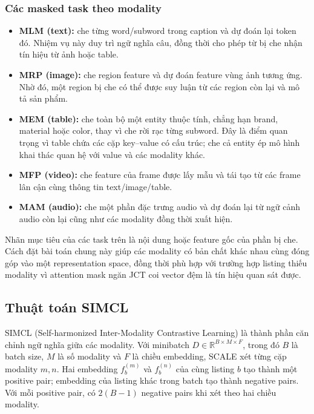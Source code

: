 \documentclass[10pt,conference]{IEEEtran}
\begin{document}
\subsubsection{Các masked task theo modality}

\begin{itemize}[leftmargin=*]
    \item \textbf{MLM (text):} che từng word/subword trong caption và dự đoán lại token đó. Nhiệm vụ này duy trì ngữ nghĩa câu, đồng thời cho phép từ bị che nhận tín hiệu từ ảnh hoặc table.
    \item \textbf{MRP (image):} che region feature và dự đoán feature vùng ảnh tương ứng. Nhờ đó, một region bị che có thể được suy luận từ các region còn lại và mô tả sản phẩm.
    \item \textbf{MEM (table):} che toàn bộ một entity thuộc tính, chẳng hạn brand, material hoặc color, thay vì che rời rạc từng subword. Đây là điểm quan trọng vì table chứa các cặp key--value có cấu trúc; che cả entity ép mô hình khai thác quan hệ với value và các modality khác.
    \item \textbf{MFP (video):} che feature của frame được lấy mẫu và tái tạo từ các frame lân cận cùng thông tin text/image/table.
    \item \textbf{MAM (audio):} che một phần đặc trưng audio và dự đoán lại từ ngữ cảnh audio còn lại cũng như các modality đồng thời xuất hiện.
\end{itemize}

Nhãn mục tiêu của các task trên là nội dung hoặc feature gốc của phần bị che. Cách đặt bài toán chung này giúp các modality có bản chất khác nhau cùng đóng góp vào một representation space, đồng thời phù hợp với trường hợp listing thiếu modality vì attention mask ngăn JCT coi vector đệm là tín hiệu quan sát được.

\subsection{Thuật toán SIMCL}

SIMCL (Self-harmonized Inter-Modality Contrastive Learning) là thành phần căn chỉnh ngữ nghĩa giữa các modality. Với minibatch $D\in\mathbb{R}^{B\times M\times F}$, trong đó $B$ là batch size, $M$ là số modality và $F$ là chiều embedding, SCALE xét từng cặp modality $m,n$. Hai embedding $f_b^{(m)}$ và $f_b^{(n)}$ của cùng listing $b$ tạo thành một positive pair; embedding của listing khác trong batch tạo thành negative pairs. Với mỗi positive pair, có $2(B-1)$ negative pairs khi xét theo hai chiều modality.
\end{document}
